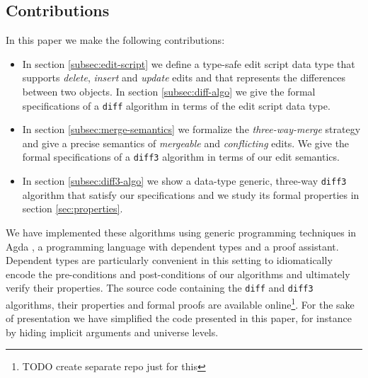 \documentclass[preprint]{sigplanconf}
\theoremstyle{plain}
\begin{document}

\subsection{Contributions}
In this paper we make the following contributions:
\begin{itemize}
\item In section \ref{subsec:edit-script} we define a type-safe edit script data 
      type that supports \emph{delete}, \emph{insert} and \emph{update} edits and 
      that represents the differences between two objects. In section 
      \ref{subsec:diff-algo} we give the formal specifications of a \texttt{diff} 
      algorithm in terms of the edit script data type.
\item In section \ref{subsec:merge-semantics} we formalize the 
      \emph{three-way-merge} strategy and give a precise semantics of 
      \emph{mergeable} and \emph{conflicting} edits. We give 
      the formal specifications of a \texttt{diff3} algorithm in terms of our edit 
      semantics. 
\item In section \ref{subsec:diff3-algo} we show a data-type generic, three-way 
      \texttt{diff3} algorithm that satisfy our specifications and we study its 
      formal properties in section \ref{sec:properties}.
\end{itemize}
We have implemented these algorithms using generic programming techniques in Agda \cite{agda}, a programming language with dependent types and a proof assistant. 
Dependent types are particularly convenient in this setting to idiomatically encode the pre-conditions and post-conditions of our algorithms and ultimately verify their properties.
The source code containing the \texttt{diff} and \texttt{diff3} algorithms, their properties and formal proofs are available online\footnote{TODO create separate repo just for this}. 
For the sake of presentation we have simplified the code presented in this paper, for instance by 
hiding implicit arguments and universe levels.
\end{document}
